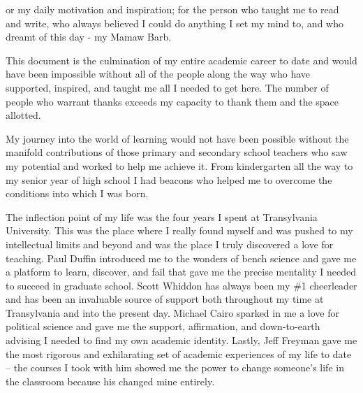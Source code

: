 \documentclass[PhD]{dukethesis2006}
\begin{document}
\dedication

For my daily motivation and inspiration; for the person who taught me to read and write, who always believed I could do anything I set my mind to, and who dreamt of this day - my Mamaw Barb.


\listoftables

\listoffigures

\acknowledgements

\begin{doublespace}

This document is the culmination of my entire academic career to date and would have been impossible without all of the people along the way who have supported, inspired, and taught me all I needed to get here. The number of people who warrant thanks exceeds my capacity to thank them and the space allotted. 

My journey into the world of learning would not have been possible without the manifold contributions of those primary and secondary school teachers who saw my potential and worked to help me achieve it. From kindergarten all the way to my senior year of high school I had beacons who helped me to overcome the conditions into which I was born. 

The inflection point of my life was the four years I spent at Transylvania University. This was the place where I really found myself and was pushed to my intellectual limits and beyond and was the place I truly discovered a love for teaching. Paul Duffin introduced me to the wonders of bench science and gave me a platform to learn, discover, and fail that gave me the precise mentality I needed to succeed in graduate school. Scott Whiddon has always been my \#1 cheerleader and has been an invaluable source of support both throughout my time at Transylvania and into the present day. Michael Cairo sparked in me a love for political science and gave me the support, affirmation, and down-to-earth advising I needed to find my own academic identity. Lastly, Jeff Freyman gave me the most rigorous and exhilarating set of academic experiences of my life to date -- the courses I took with him showed me the power to change someone's life in the classroom because his changed mine entirely.


\end{doublespace}
\end{document}
